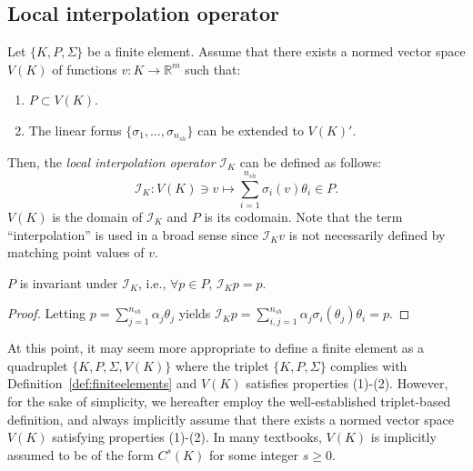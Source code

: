 \subsection{Local interpolation operator}
Let $\{K, P, \Sigma\}$ be a finite element. Assume that there exists a normed vector space $V(K)$ of functions $v: K \rightarrow \mathbb{R}^m$ such that:
\begin{enumerate}
    \item $P \subset V(K)$.
    \item The linear forms $\{\sigma_1, \dots, \sigma_{n_{sh}}\}$ can be extended to $V(K)'$.
\end{enumerate}
Then, the \emph{local interpolation operator} $\mathcal{I}_K$ can be defined as follows:
\begin{equation}
    \mathcal{I}_K: V(K) \ni v \mapsto \sum_{i=1}^{n_{sh}} \sigma_i(v) \theta_i \in P.
\end{equation}
$V(K)$ is the domain of $\mathcal{I}_K$ and $P$ is its codomain. Note that the term ``interpolation'' is used in a broad sense since $\mathcal{I}_K v$ is not necessarily defined by matching point values of $v$.
\begin{lemma}\label{lemma:P_invariant_under_IK}
    $P$ is invariant under $\mathcal{I}_K$, i.e., $\forall p \in P$, $\mathcal{I}_K p = p$.
    \begin{proof}
        Letting $p = \sum_{j=1}^{n_{sh}} \alpha_j \theta_j$ yields $\mathcal{I}_K p = \sum_{i,j=1}^{n_{sh}} \alpha_j \sigma_i(\theta_j) \theta_i = p$.
    \end{proof}
\end{lemma}


At this point, it may seem more appropriate to define a finite element as a quadruplet $\{K, P, \Sigma, V(K)\}$ where the triplet $\{K, P, \Sigma\}$ complies with Definition~\ref{def:finiteelements} and $V(K)$ satisfies properties (1)-(2). However, for the sake of simplicity, we hereafter employ the well-established triplet-based definition, and always implicitly assume that there exists a normed vector space $V(K)$ satisfying properties (1)-(2). In many textbooks, $V(K)$ is implicitly assumed to be of the form $C^s(K)$ for some integer $s \ge 0$.

